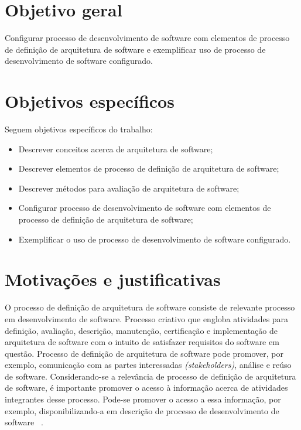 \section{Objetivo geral}

Configurar processo de desenvolvimento de software com elementos de processo de definição de arquitetura de software e exemplificar uso de processo de desenvolvimento de software configurado.

\section{Objetivos específicos}

Seguem objetivos específicos do trabalho:

\begin{itemize}
    \item Descrever conceitos acerca de arquitetura de software;
    \item Descrever elementos de processo de definição de arquitetura de software;
    \item Descrever métodos para avaliação de arquitetura de software;
    \item Configurar processo de desenvolvimento de software com elementos de processo de definição de arquitetura de software;
    \item Exemplificar o uso de processo de desenvolvimento de software configurado.
\end{itemize}

\section{Motivações e justificativas}

O processo de definição de arquitetura de software consiste de relevante processo em desenvolvimento de software. Processo criativo que engloba atividades para definição, avaliação, descrição, manutenção, certificação e implementação de arquitetura de software com o intuito de satisfazer requisitos do software em questão. Processo de definição de arquitetura de software pode promover, por exemplo, comunicação com as partes interessadas \emph{(stakeholders)}, análise e reúso de software. Considerando-se a relevância de processo de definição de arquitetura de software, é importante promover o acesso à informação acerca de atividades integrantes desse processo. Pode-se promover o acesso a essa informação, por exemplo, disponibilizando-a em descrição de processo de desenvolvimento de software  ~\cite{Sommerville_2011_texbook}.

